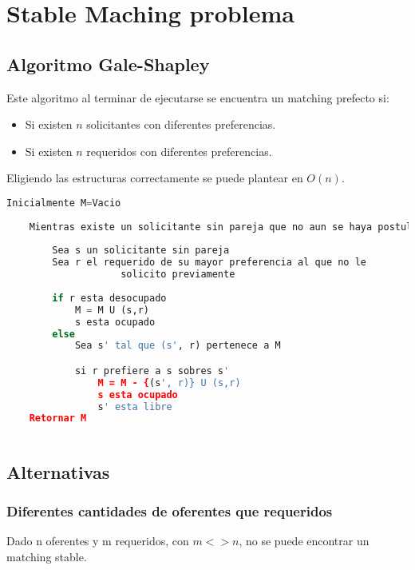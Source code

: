 \documentclass{article}
\begin{document}
\newpage{}
\tableofcontents
\newpage{}

\newpage
\section{Stable Maching problema}

\subsection{Algoritmo Gale-Shapley}
Este algoritmo al terminar de ejecutarse se encuentra un matching prefecto si:
\begin{itemize}
    \item Si existen \(n\) solicitantes con diferentes preferencias.
    \item Si existen \(n\) requeridos con diferentes preferencias.
\end{itemize}
Eligiendo las estructuras correctamente se puede plantear en \(O(n)\).

\begin{lstlisting}[language=Python, caption=Algoritmo de Gale-Shapley]
    Inicialmente M=Vacio
    
    Mientras existe un solicitante sin pareja que no aun se haya postulado a todas las parejas
    
        Sea s un solicitante sin pareja
        Sea r el requerido de su mayor preferencia al que no le
                    solicito previamente
            
        if r esta desocupado
            M = M U (s,r)
            s esta ocupado
        else
            Sea s' tal que (s', r) pertenece a M

            si r prefiere a s sobres s'
                M = M - {(s', r)} U (s,r)
                s esta ocupado
                s' esta libre
    Retornar M
    
\end{lstlisting}    

\subsection{Alternativas}
\subsubsection{Diferentes cantidades de oferentes que requeridos}

Dado n oferentes y m requeridos, con \(m <> n\), no se puede encontrar un matching stable. 
\end{document}
